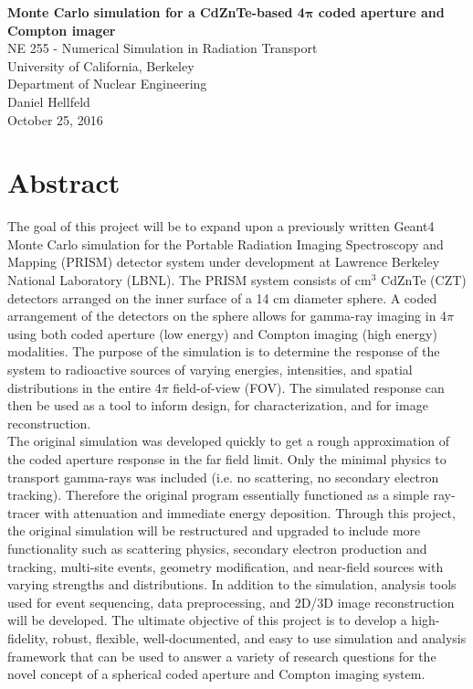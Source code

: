 \documentclass[10pt]{article}
\begin{document}
\begin{centering}
\textbf{Monte Carlo simulation for a CdZnTe-based 4$\boldsymbol{\pi}$ coded aperture and Compton imager}\\
\vspace{10pt}
NE 255 - Numerical Simulation in Radiation Transport\\
University of California, Berkeley\\
Department of Nuclear Engineering\\
\vspace{10pt}
Daniel Hellfeld\\
\vspace{10pt}
October 25, 2016 \\
\end{centering}


\section*{Abstract}

The goal of this project will be to expand upon a previously written Geant4 Monte Carlo simulation for the Portable Radiation Imaging Spectroscopy and Mapping (PRISM) detector system under development at Lawrence Berkeley National Laboratory (LBNL). The PRISM system consists of cm$^3$ CdZnTe (CZT) detectors arranged on the inner surface of a 14 cm diameter sphere. A coded arrangement of the detectors on the sphere allows for gamma-ray imaging in 4$\pi$ using both coded aperture (low energy) and Compton imaging (high energy) modalities. The purpose of the simulation is to determine the response of the system to radioactive sources of varying energies, intensities, and spatial distributions in the entire 4$\pi$ field-of-view (FOV). The simulated response can then be used as a tool to inform design, for characterization, and for image reconstruction. \\

The original simulation was developed quickly to get a rough approximation of the coded aperture response in the far field limit. Only the minimal physics to transport gamma-rays was included (i.e. no scattering, no secondary electron tracking). Therefore the original program essentially functioned as a simple ray-tracer with attenuation and immediate energy deposition. Through this project, the original simulation will be restructured and upgraded to include more functionality such as scattering physics, secondary electron production and tracking, multi-site events, geometry modification, and near-field sources with varying strengths and distributions. In addition to the simulation, analysis tools used for event sequencing, data preprocessing, and 2D/3D image reconstruction will be developed. The ultimate objective of this project is to develop a high-fidelity, robust, flexible, well-documented, and easy to use simulation and analysis framework that can be used to answer a variety of research questions for the novel concept of a spherical coded aperture and Compton imaging system. \\
\end{document}
